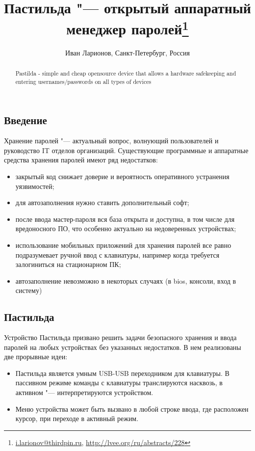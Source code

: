 \documentclass[10pt, a5paper]{article}
\begin{document}
\title{Пастильда "--- открытый аппаратный менеджер паролей\footnote{\url{i.larionov@thirdpin.ru}, \url{http://lvee.org/ru/abstracts/228}}}
\author{Иван Ларионов, Санкт-Петербург, Россия}
\maketitle
\begin{abstract}
Pastilda - simple and cheap opensource device that allows a hardware safekeeping and entering usernames/passwords on all types of devices
\end{abstract}
\subsection*{Введение}

Хранение паролей "--- актуальный вопрос, волнующий пользователей и руководство IT отделов организаций. Существующие программные и аппаратные средства хранения паролей имеют ряд недостатков:

\begin{itemize}
  \item закрытый код снижает доверие и вероятность оперативного устранения уязвимостей;
  \item для автозаполнения нужно ставить дополнительный софт;
  \item после ввода мастер-пароля вся база открыта и доступна, в том числе для вредоносного ПО, что особенно актуально на недоверенных устройствах;
  \item использование мобильных приложений для хранения паролей все равно подразумевает ручной ввод с клавиатуры, например когда требуется залогиниться на стационарном ПК;
  \item автозаполнение невозможно в некоторых случаях (в bios, консоли, вход в систему)
\end{itemize}

\subsection*{Пастильда}

Устройство Пастильда призвано решить задачи безопасного хранения и ввода паролей на любых устройствах без указанных недостатков. В нем реализованы две прорывные идеи:

\begin{itemize}
  \item Пастильда является умным USB-USB переходником для клавиатуры. В пассивном режиме команды с клавиатуры транслируются насквозь, в активном "--- интерпретируются устройством.
  \item Меню устройства может быть вызвано в любой строке ввода, где расположен курсор, при переходе в активный режим.
\end{itemize}
\end{document}
